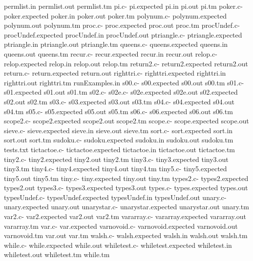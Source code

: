\documentclass[12pt]{book}
\begin{document}
permlist.in
permlist.out
permlist.tm
pi.c-
pi.expected
pi.in
pi.out
pi.tm
poker.c-
poker.expected
poker.in
poker.out
poker.tm
polynum.c-
polynum.expected
polynum.out
polynum.tm
proc.c-
proc.expected
proc.out
proc.tm
procUndef.c-
procUndef.expected
procUndef.in
procUndef.out
ptriangle.c-
ptriangle.expected
ptriangle.in
ptriangle.out
ptriangle.tm
queens.c-
queens.expected
queens.in
queens.out
queens.tm
recur.c-
recur.expected
recur.in
recur.out
relop.c-
relop.expected
relop.in
relop.out
relop.tm
return2.c-
return2.expected
return2.out
return.c-
return.expected
return.out
righttri.c-
righttri.expected
righttri.in
righttri.out
righttri.tm
runExamples.in
s00.c-
s00.expected
s00.out
s00.tm
s01.c-
s01.expected
s01.out
s01.tm
s02.c-
s02e.c-
s02e.expected
s02e.out
s02.expected
s02.out
s02.tm
s03.c-
s03.expected
s03.out
s03.tm
s04.c-
s04.expected
s04.out
s04.tm
s05.c-
s05.expected
s05.out
s05.tm
s06.c-
s06.expected
s06.out
s06.tm
scope2.c-
scope2.expected
scope2.out
scope2.tm
scope.c-
scope.expected
scope.out
sieve.c-
sieve.expected
sieve.in
sieve.out
sieve.tm
sort.c-
sort.expected
sort.in
sort.out
sort.tm
sudoku.c-
sudoku.expected
sudoku.in
sudoku.out
sudoku.tm
tests.txt
tictactoe.c-
tictactoe.expected
tictactoe.in
tictactoe.out
tictactoe.tm
tiny2.c-
tiny2.expected
tiny2.out
tiny2.tm
tiny3.c-
tiny3.expected
tiny3.out
tiny3.tm
tiny4.c-
tiny4.expected
tiny4.out
tiny4.tm
tiny5.c-
tiny5.expected
tiny5.out
tiny5.tm
tiny.c-
tiny.expected
tiny.out
tiny.tm
types2.c-
types2.expected
types2.out
types3.c-
types3.expected
types3.out
types.c-
types.expected
types.out
typesUndef.c-
typesUndef.expected
typesUndef.in
typesUndef.out
unary.c-
unary.expected
unary.out
unarystar.c-
unarystar.expected
unarystar.out
unary.tm
var2.c-
var2.expected
var2.out
var2.tm
vararray.c-
vararray.expected
vararray.out
vararray.tm
var.c-
var.expected
varnovoid.c-
varnovoid.expected
varnovoid.out
varnovoid.tm
var.out
var.tm
walsh.c-
walsh.expected
walsh.in
walsh.out
walsh.tm
while.c-
while.expected
while.out
whiletest.c-
whiletest.expected
whiletest.in
whiletest.out
whiletest.tm
while.tm
\end{document}
